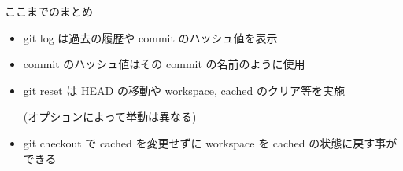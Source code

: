 
\begin{frame}[t]{ここまでのまとめ}{}

  \begin{itemize}
  \item git log は過去の履歴や commit のハッシュ値を表示
    \vspace{2ex}

  \item commit のハッシュ値はその commit の名前のように使用
    \vspace{2ex}

  \item git reset は HEAD の移動や workspace, cached のクリア等を実施

    (オプションによって挙動は異なる)
    \vspace{2ex}

  \item git checkout で cached を変更せずに workspace を cached の状態に戻す事ができる
  \end{itemize}

\end{frame}
